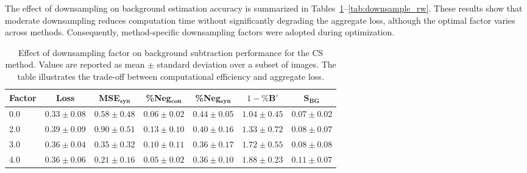 
The effect of downsampling on background estimation accuracy is summarized in Tables~\ref{tab:downsample_cs}--\ref{tab:downsample_rw}. These results show that moderate downsampling reduces computation time without significantly degrading the aggregate loss, although the optimal factor varies across methods. Consequently, method-specific downsampling factors were adopted during optimization.


\begin{table}[h]
\centering
\small
\begin{tabular}{lcccccc}
\hline
Factor & Loss & MSE$_{\mathbf{syn}}$ & \%Neg$_{\mathbf{con}}$ & \%Neg$_{\mathbf{syn}}$ & $1-\%\mathbf{B}'$ & $\mathbf{S}_{\mathbf{BG}}$ \\
\hline
0.0 & $0.33 \pm 0.08$ & $0.58 \pm 0.48$ & $0.06 \pm 0.02$ & $0.44 \pm 0.05$ & $1.04 \pm 0.45$ & $0.07 \pm 0.02$ \\
2.0 & $0.39 \pm 0.09$ & $0.90 \pm 0.51$ & $0.13 \pm 0.10$ & $0.40 \pm 0.16$ & $1.33 \pm 0.72$ & $0.08 \pm 0.07$ \\
3.0 & $0.36 \pm 0.04$ & $0.35 \pm 0.32$ & $0.10 \pm 0.11$ & $0.36 \pm 0.17$ & $1.72 \pm 0.55$ & $0.08 \pm 0.08$ \\
4.0 & $0.36 \pm 0.06$ & $0.21 \pm 0.16$ & $0.05 \pm 0.02$ & $0.36 \pm 0.10$ & $1.88 \pm 0.23$ & $0.11 \pm 0.07$ \\
\hline
\end{tabular}
\caption{Effect of downsampling factor on background subtraction performance for the CS method. Values are reported as mean $\pm$ standard deviation over a subset of images. The table illustrates the trade-off between computational efficiency and aggregate loss.}
\label{tab:downsample_cs}
\end{table}

